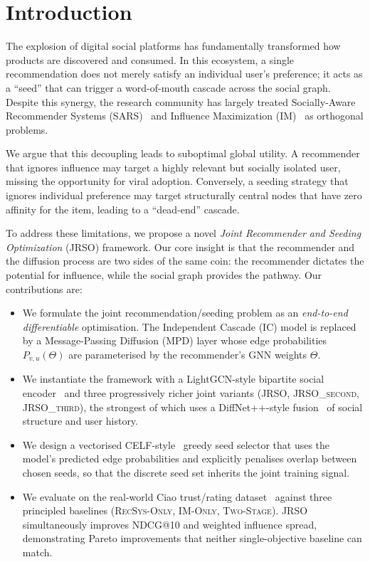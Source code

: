 \documentclass[conference]{IEEEtran}
\begin{document}
\section{Introduction}
The explosion of digital social platforms has fundamentally transformed
how products are discovered and consumed. In this ecosystem, a single
recommendation does not merely satisfy an individual user's preference;
it acts as a ``seed'' that can trigger a word-of-mouth cascade across
the social graph. Despite this synergy, the research community has
largely treated Socially-Aware Recommender Systems
(SARS)~\cite{SocialRecsysopinion,SocialRecsys} and Influence
Maximization (IM)~\cite{Influencemax} as orthogonal problems.

We argue that this decoupling leads to suboptimal global utility. A
recommender that ignores influence may target a highly relevant but
socially isolated user, missing the opportunity for viral adoption.
Conversely, a seeding strategy that ignores individual preference may
target structurally central nodes that have zero affinity for the item,
leading to a ``dead-end'' cascade.

To address these limitations, we propose a novel \emph{Joint Recommender
and Seeding Optimization} (JRSO) framework. Our core insight is that
the recommender and the diffusion process are two sides of the same
coin: the recommender dictates the potential for influence, while the
social graph provides the pathway. Our contributions are:
\begin{itemize}
    \item We formulate the joint recommendation/seeding problem as an
    \emph{end-to-end differentiable} optimisation. The Independent
    Cascade (IC) model is replaced by a Message-Passing Diffusion (MPD)
    layer whose edge probabilities $P_{v,u}(\Theta)$ are parameterised
    by the recommender's GNN weights $\Theta$.
    \item We instantiate the framework with a LightGCN-style bipartite
    social encoder~\cite{he2020lightgcn,liao2022sociallgn} and three
    progressively richer joint variants (\textsc{JRSO},
    \textsc{JRSO\_second}, \textsc{JRSO\_third}), the strongest of
    which uses a DiffNet++-style fusion~\cite{wu2020diffnet++} of social
    structure and user history.
    \item We design a vectorised CELF-style~\cite{leskovec2007celf}
    greedy seed selector that uses the model's predicted edge
    probabilities and explicitly penalises overlap between chosen seeds,
    so that the discrete seed set inherits the joint training signal.
    \item We evaluate on the real-world Ciao trust/rating
    dataset~\cite{tang2012trustnetwork} against three principled
    baselines (\textsc{RecSys-Only}, \textsc{IM-Only},
    \textsc{Two-Stage}). JRSO simultaneously improves NDCG@10 and
    weighted influence spread, demonstrating Pareto improvements that
    neither single-objective baseline can match.
\end{itemize}
\end{document}
